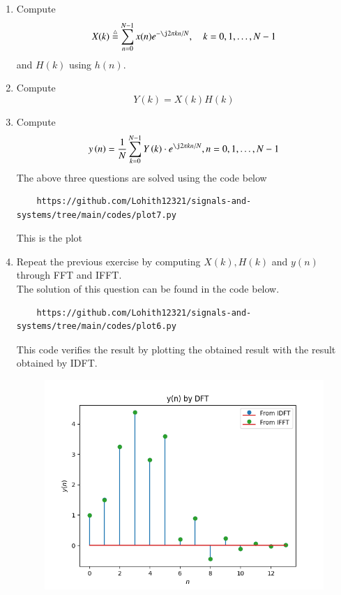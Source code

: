 \documentclass[journal,12pt,twocolumn]{IEEEtran}
\newcommand{\define}{\stackrel{\triangle}{=}}
\theoremstyle{remark}
\begin{document}
\begin{enumerate}[label=\thesection.\arabic*
,ref=\thesection.\theenumi]
\begin{enumerate}[label=\thesection.\arabic*
,ref=\thesection.\theenumi]
\begin{enumerate}[label=\thesection.\arabic*
,ref=\thesection.\theenumi]
\section{DFT and FFT}
\item
Compute
\begin{equation}
X(k) \define \sum _{n=0}^{N-1}x(n) e^{-\j2\pi kn/N}, \quad k = 0,1,\dots, N-1
\end{equation}
and $H(k)$ using $h(n)$.
\item Compute 
\begin{equation}
Y(k) = X(k)H(k)
\label{eq:fp}
\end{equation}
\item Compute
\begin{equation}
y\brak{n}={\frac {1}{N}}\sum _{k=0}^{N-1}Y\brak{k}\cdot e^{\j 2\pi kn/N},
\label{eq:inv-ft}
n = 0,1,\dots, N-1
\end{equation}
\solution The above three questions are solved using the code below\\
\begin{lstlisting}
    https://github.com/Lohith12321/signals-and-systems/tree/main/codes/plot7.py    
\end{lstlisting}
This is the plot 
\item Repeat the previous exercise by computing $X(k), H(k)$ and $y(n)$ through FFT and IFFT.\\
\solution The solution of this question can be found in the code below.\\
\begin{lstlisting}
    https://github.com/Lohith12321/signals-and-systems/tree/main/codes/plot6.py    
\end{lstlisting}
This code verifies the result by plotting the obtained result with the result obtained by IDFT.
\begin{figure}[ht]
    \centering  
\includegraphics[width=\columnwidth]{figs/plot6.png}

\end{figure}
\end{enumerate}
\end{enumerate}
\end{enumerate}
\end{document}
